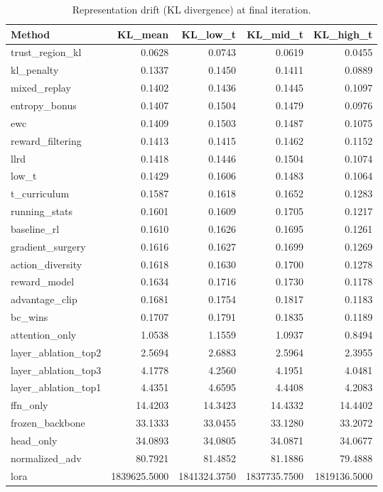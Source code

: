 \begin{table}[htbp]
\centering
\caption{Representation drift (KL divergence) at final iteration.}
\label{tab:repr_drift}
\begin{tabular}{lrrrr}
\toprule
\textbf{Method} & \textbf{KL\_mean} & \textbf{KL\_low\_t} & \textbf{KL\_mid\_t} & \textbf{KL\_high\_t} \\
\midrule
trust\_region\_kl & 0.0628 & 0.0743 & 0.0619 & 0.0455 \\
kl\_penalty & 0.1337 & 0.1450 & 0.1411 & 0.0889 \\
mixed\_replay & 0.1402 & 0.1436 & 0.1445 & 0.1097 \\
entropy\_bonus & 0.1407 & 0.1504 & 0.1479 & 0.0976 \\
ewc & 0.1409 & 0.1503 & 0.1487 & 0.1075 \\
reward\_filtering & 0.1413 & 0.1415 & 0.1462 & 0.1152 \\
llrd & 0.1418 & 0.1446 & 0.1504 & 0.1074 \\
low\_t & 0.1429 & 0.1606 & 0.1483 & 0.1064 \\
t\_curriculum & 0.1587 & 0.1618 & 0.1652 & 0.1283 \\
running\_stats & 0.1601 & 0.1609 & 0.1705 & 0.1217 \\
baseline\_rl & 0.1610 & 0.1626 & 0.1695 & 0.1261 \\
gradient\_surgery & 0.1616 & 0.1627 & 0.1699 & 0.1269 \\
action\_diversity & 0.1618 & 0.1630 & 0.1700 & 0.1278 \\
reward\_model & 0.1634 & 0.1716 & 0.1730 & 0.1178 \\
advantage\_clip & 0.1681 & 0.1754 & 0.1817 & 0.1183 \\
bc\_wins & 0.1707 & 0.1791 & 0.1835 & 0.1189 \\
attention\_only & 1.0538 & 1.1559 & 1.0937 & 0.8494 \\
layer\_ablation\_top2 & 2.5694 & 2.6883 & 2.5964 & 2.3955 \\
layer\_ablation\_top3 & 4.1778 & 4.2560 & 4.1951 & 4.0481 \\
layer\_ablation\_top1 & 4.4351 & 4.6595 & 4.4408 & 4.2083 \\
ffn\_only & 14.4203 & 14.3423 & 14.4332 & 14.4402 \\
frozen\_backbone & 33.1333 & 33.0455 & 33.1280 & 33.2072 \\
head\_only & 34.0893 & 34.0805 & 34.0871 & 34.0677 \\
normalized\_adv & 80.7921 & 81.4852 & 81.1886 & 79.4888 \\
lora & 1839625.5000 & 1841324.3750 & 1837735.7500 & 1819136.5000 \\
\bottomrule
\end{tabular}
\end{table}